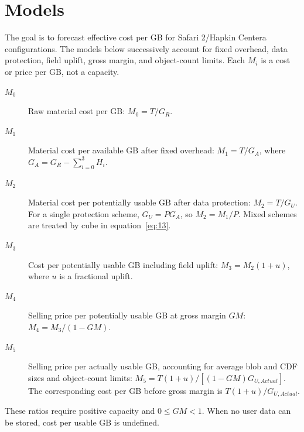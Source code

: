 \section{Models}\label{models-1}

The goal is to forecast effective cost per GB for Safari 2/Hapkin Centera
configurations. The models below successively account for fixed overhead,
data protection, field uplift, gross margin, and object-count limits.
Each \(M_i\) is a cost or price per GB, not a capacity.

\begin{description}
\item[\(M_0\)] Raw material cost per GB: \(M_0=T/G_R\).
\item[\(M_1\)] Material cost per available GB after fixed overhead:
\(M_1=T/G_A\), where \(G_A=G_R-\sum_{i=0}^{3}H_i\).
\item[\(M_2\)] Material cost per potentially usable GB after data protection:
\(M_2=T/G_U\). For a single protection scheme, \(G_U=P G_A\), so
\(M_2=M_1/P\). Mixed schemes are treated by cube in equation~\eqref{eq:13}.
\item[\(M_3\)] Cost per potentially usable GB including field uplift:
\(M_3=M_2(1+u)\), where \(u\) is a fractional uplift.
\item[\(M_4\)] Selling price per potentially usable GB at gross margin \(GM\):
\(M_4=M_3/(1-GM)\).
\item[\(M_5\)] Selling price per actually usable GB, accounting for average
blob and CDF sizes and object-count limits:
\(M_5=T(1+u)/[(1-GM)G_{U,Actual}]\).
The corresponding cost per GB before gross margin is
\(T(1+u)/G_{U,Actual}\).
\end{description}

These ratios require positive capacity and \(0\leq GM<1\).
When no user data can be stored, cost per usable GB is undefined.
